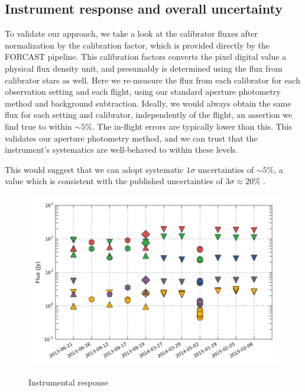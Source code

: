 \subsection{Instrument response and overall uncertainty}
To validate our approach, we take a look at the calibrator fluxes after normalization by the calibration factor, which is provided directly by the FORCAST pipeline. This calibration factors converts the pixel digital value a physical flux density unit, and presumably is determined using the flux from calibrator stars as well. Here we re-measure the flux from each calibrator for each observation setting and each flight, using our standard aperture photometry method and background subtraction. Ideally, we would always obtain the same flux for each setting and calibrator, independently of the flight, an assertion we find true to within $\sim 5\%$. The in-flight errors are typically lower than this. This validates our aperture photometry method, and we can trust that the instrument's systematics are well-behaved to within these levels. 

This would suggest that we can adopt systematic $1\sigma$ uncertainties of $\sim 5\%$, a value which is consistent with the published uncertainties of $3\sigma \approx 20\%$ \citep{DeBuizer:2012ie}.


\begin{figure}[!h]
\begin{center}
\includegraphics[width=\textwidth]{Figures/Phot_val.png}
\label{fig:response}
\vspace{-0.5cm}
\caption[Instrumental response]{Instrumental response}
\end{center}
\end{figure}




